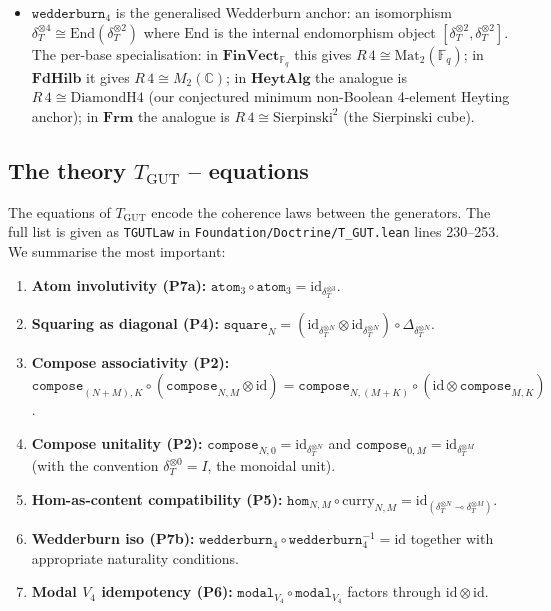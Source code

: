 \documentclass[11pt,a4paper]{article}
\theoremstyle{plain}
\theoremstyle{definition}
\theoremstyle{remark}
\newcommand{\F}{\mathbb{F}}
\newcommand{\C}{\mathbb{C}}
\newcommand{\cat}[1]{\mathbf{#1}}
\newcommand{\HeytAlg}{\cat{HeytAlg}}
\newcommand{\FdHilb}{\cat{FdHilb}}
\newcommand{\Frm}{\cat{Frm}}
\newcommand{\FinVect}{\cat{FinVect}}
\newcommand{\End}{\mathrm{End}}
\newcommand{\Mat}{\mathrm{Mat}}
\newcommand{\id}{\mathrm{id}}
\newcommand{\TGUT}{T_{\mathrm{GUT}}}
\newcommand{\DiamondH}{\mathrm{DiamondH4}}
\newcommand{\Sierp}{\mathrm{Sierpinski}}
\begin{document}
\begin{itemize}[leftmargin=*]
\item $\mathtt{wedderburn}_4$ is the generalised Wedderburn anchor: an isomorphism $\delta_T^{\otimes 4} \cong \End(\delta_T^{\otimes 2})$ where $\End$ is the internal endomorphism object $[\delta_T^{\otimes 2}, \delta_T^{\otimes 2}]$. The per-base specialisation: in $\FinVect_{\F_q}$ this gives $R\,4 \cong \Mat_2(\F_q)$; in $\FdHilb$ it gives $R\,4 \cong M_2(\C)$; in $\HeytAlg$ the analogue is $R\,4 \cong \DiamondH$ (our conjectured minimum non-Boolean 4-element Heyting anchor); in $\Frm$ the analogue is $R\,4 \cong \Sierp^2$ (the Sierpinski cube).
\end{itemize}

\subsection{The theory $\TGUT$ -- equations}\label{sec:tgut:eqns}

The equations of $\TGUT$ encode the coherence laws between the generators. The full list is given as \texttt{TGUTLaw} in \texttt{Foundation/Doctrine/T\_GUT.lean} lines 230--253. We summarise the most important:

\begin{enumerate}[leftmargin=*]
\item \textbf{Atom involutivity (P7a):} $\mathtt{atom}_3 \circ \mathtt{atom}_3 = \id_{\delta_T^{\otimes 3}}$.

\item \textbf{Squaring as diagonal (P4):} $\mathtt{square}_N = (\id_{\delta_T^{\otimes N}} \otimes \id_{\delta_T^{\otimes N}}) \circ \Delta_{\delta_T^{\otimes N}}$.

\item \textbf{Compose associativity (P2):} $\mathtt{compose}_{(N+M),K} \circ (\mathtt{compose}_{N,M} \otimes \id) = \mathtt{compose}_{N,(M+K)} \circ (\id \otimes \mathtt{compose}_{M,K})$.

\item \textbf{Compose unitality (P2):} $\mathtt{compose}_{N,0} = \id_{\delta_T^{\otimes N}}$ and $\mathtt{compose}_{0,M} = \id_{\delta_T^{\otimes M}}$ (with the convention $\delta_T^{\otimes 0} = I$, the monoidal unit).

\item \textbf{Hom-as-content compatibility (P5):} $\mathtt{hom}_{N,M} \circ \mathrm{curry}_{N,M} = \id_{(\delta_T^{\otimes N} \multimap \delta_T^{\otimes M})}$.

\item \textbf{Wedderburn iso (P7b):} $\mathtt{wedderburn}_4 \circ \mathtt{wedderburn}_4^{-1} = \id$ together with appropriate naturality conditions.

\item \textbf{Modal $V_4$ idempotency (P6):} $\mathtt{modal}_{V_4} \circ \mathtt{modal}_{V_4}$ factors through $\id \otimes \id$.
\end{enumerate}
\end{document}
